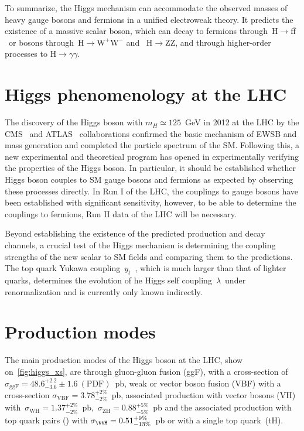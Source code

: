 To summarize, the Higgs mechanism can accommodate the observed masses of heavy gauge bosons and fermions in a unified electroweak theory. It predicts the existence of a massive scalar boson, which can decay to fermions through~$\mathrm{H} \rightarrow \mathrm{f} \bar{\mathrm{f}}$~or bosons through~$\mathrm{H} \rightarrow \mathrm{W}^+ \mathrm{W}^-$ and ~$\mathrm{H} \rightarrow \mathrm{Z} \mathrm{Z}$, and through higher-order processes to $\mathrm{H} \rightarrow \gamma \gamma$.

\section{Higgs phenomenology at the LHC}
The discovery of the Higgs boson with $m_H \simeq 125$~GeV in 2012 at the LHC by the CMS~\cite{Chatrchyan:2012xdj} and ATLAS~\cite{Aad:2012tfa} collaborations confirmed the basic mechanism of EWSB and mass generation and completed the particle spectrum of the SM. Following this, a new experimental and theoretical program has opened in experimentally verifying the properties of the Higgs boson. In particular, it should be established whether Higgs boson couples to SM gauge bosons and fermions as expected by observing these processes directly. In Run I of the LHC, the couplings to gauge bosons have been established with significant sensitivity, however, to be able to determine the couplings to fermions, Run II data of the LHC will be necessary.

Beyond establishing the existence of the predicted production and decay channels, a crucial test of the Higgs mechanism is determining the coupling strengths of the new scalar to SM fields and comparing them to the predictions. The top quark Yukawa coupling~$y_t$~, which is much larger than that of lighter quarks, determines the evolution of he Higgs self coupling~$\lambda$~under renormalization and is currently only known indirectly.

\section{Production modes}
The main production modes of the Higgs boson at the LHC, show on~\cref{fig:higgs_xs}, are through gluon-gluon fusion (ggF), with a cross-section of~$\sigma_{\mathrm{ggF}} = 48.6^{+2.2}_{-3.6}\pm1.6~(\mathrm{PDF})$~pb, weak or vector boson fusion (VBF) with a cross-section $\sigma_{\mathrm{VBF}} = 3.78^{+2\%}_{-2\%}$~pb, associated production with vector bosons (VH) with~$\sigma_{\mathrm{WH}} = 1.37^{+2\%}_{-2\%}$~pb,~$\sigma_{\mathrm{ZH}} = 0.88^{+5\%}_{-5\%}$~pb and the associated production with top quark pairs (\ttH) with $\sigma_{\ttH} = 0.51^{+9\%}_{-13\%}$~pb or with a single top quark~(tH).

